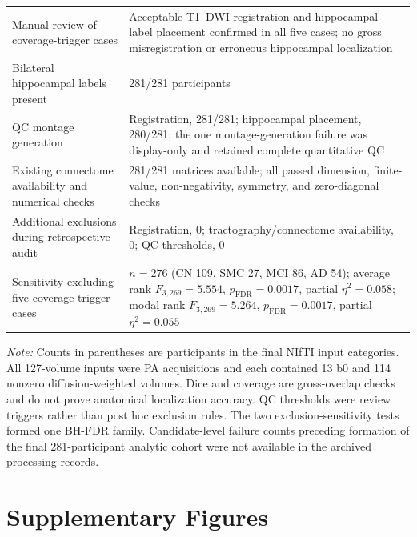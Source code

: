 \documentclass{article}
\providecommand{\DIFaddtex}[1]{{\protect\color{blue}#1}} %
\providecommand{\DIFaddend}{} %
\providecommand{\DIFaddFL}[1]{\DIFadd{#1}} %
\providecommand{\DIFadd}[1]{\texorpdfstring{\DIFaddtex{#1}}{#1}} %
\begin{document}
\begin{table}[!htbp]
\begin{tabularx}{\textwidth}{@{}p{}X@{}}
\DIFaddFL{Manual review of coverage-trigger cases }& \DIFaddFL{Acceptable T1--DWI registration and hippocampal-label placement confirmed in all five cases; no gross misregistration or erroneous hippocampal localization}\\
\DIFaddFL{Bilateral hippocampal labels present }& \DIFaddFL{281/281 participants}\\
\DIFaddFL{QC montage generation }& \DIFaddFL{Registration, 281/281; hippocampal placement, 280/281; the one montage-generation failure was display-only and retained complete quantitative QC}\\
\DIFaddFL{Existing connectome availability and numerical checks }& \DIFaddFL{281/281 matrices available; all passed dimension, finite-value, non-negativity, symmetry, and zero-diagonal checks}\\
\DIFaddFL{Additional exclusions during retrospective audit }& \DIFaddFL{Registration, 0; tractography/connectome availability, 0; QC thresholds, 0}\\
\DIFaddFL{Sensitivity excluding five coverage-trigger cases }& \DIFaddFL{$n=276$ (CN 109, SMC 27, MCI 86, AD 54); average rank $F_{3,269}=5.554$, $p_{\mathrm{FDR}}=0.0017$, partial $\eta^2=0.058$; modal rank $F_{3,269}=5.264$, $p_{\mathrm{FDR}}=0.0017$, partial $\eta^2=0.055$}\\
\bottomrule
\end{tabularx}
\par\vspace{1mm}
\footnotesize{\textit{Note:} Counts in parentheses are participants in the final NIfTI input categories. All 127-volume inputs were PA acquisitions and each contained 13 b0 and 114 nonzero diffusion-weighted volumes. Dice and coverage are gross-overlap checks and do not prove anatomical localization accuracy. QC thresholds were review triggers rather than post hoc exclusion rules. The two exclusion-sensitivity tests formed one BH-FDR family. Candidate-level failure counts preceding formation of the final 281-participant analytic cohort were not available in the archived processing records.}
\end{table}
\endgroup

\DIFaddend \FloatBarrier

\section{Supplementary Figures}
\end{document}
